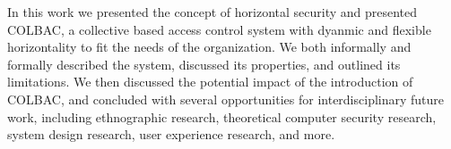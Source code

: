 In this work we presented the concept of horizontal security and presented
COLBAC, a collective based access control system with dyanmic and flexible
horizontality to fit the needs of the organization. We both informally and
formally described the system, discussed its properties, and outlined its
limitations. We then discussed the potential impact of the introduction of
COLBAC, and concluded with several opportunities for interdisciplinary future
work, including ethnographic research, theoretical computer security research,
system design research, user experience research, and more.


